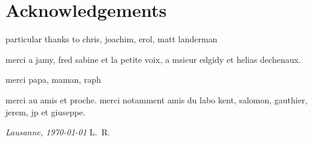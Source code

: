 \chapter*{Acknowledgements}


particular thanks to chris, joachim, erol, matt landerman

merci a jamy, fred sabine et la petite voix, a msieur edgidy et helias dechenaux.

merci papa, maman, raph

merci au amis et proche. merci notamment amis du labo kent, salomon, gauthier, jerem, jp et giuseppe.

\bigskip
 
\noindent\textit{Lausanne, \today}
\hfill L.~R.
